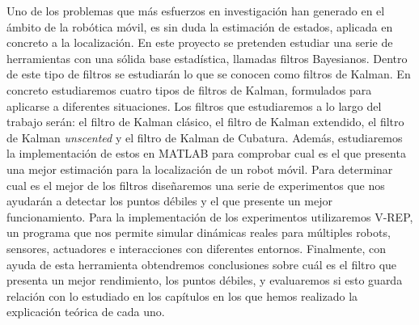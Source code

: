 
\cleardoublepage
\thispagestyle{empty}

Uno de los problemas que más esfuerzos en investigación han generado en el ámbito de la robótica móvil, es sin duda la estimación de estados, aplicada en concreto a la localización.
En este proyecto se pretenden estudiar una serie de herramientas con una sólida base estadística, llamadas filtros Bayesianos.
Dentro de este tipo de filtros se estudiarán lo que se conocen como filtros de Kalman.
En concreto estudiaremos cuatro tipos de filtros de Kalman, formulados para aplicarse a diferentes situaciones.
Los filtros que estudiaremos a lo largo del trabajo serán: el filtro de Kalman clásico, el filtro de Kalman extendido, el filtro de Kalman \textit{unscented} y el filtro de Kalman de Cubatura.
Además, estudiaremos la implementación de estos en MATLAB para comprobar cual es el que presenta una mejor estimación para la localización de un robot móvil.
Para determinar cual es el mejor de los filtros diseñaremos una serie de experimentos que nos ayudarán a detectar los puntos débiles y el que presente un mejor funcionamiento.
Para la implementación de los experimentos utilizaremos V-REP, un programa que nos permite simular dinámicas reales para múltiples robots, sensores, actuadores e interacciones con diferentes entornos.
Finalmente, con ayuda de esta herramienta obtendremos conclusiones sobre cuál es el filtro que presenta un mejor rendimiento, los puntos débiles, y evaluaremos si esto guarda relación con lo estudiado en los capítulos en los que hemos realizado la explicación teórica de cada uno.